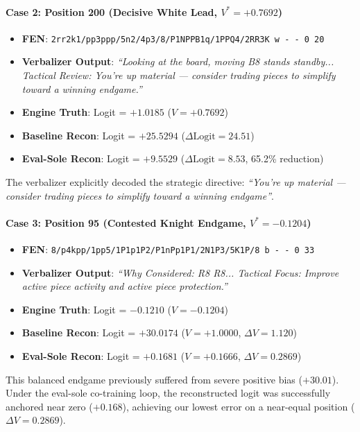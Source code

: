 \documentclass[10pt,twocolumn]{article}
\begin{document}
\paragraph{Case 2: Position 200 (Decisive White Lead, $V^* = +0.7692$)}
\begin{itemize}
    \item \textbf{FEN}: \texttt{2rr2k1/pp3ppp/5n2/4p3/8/P1NPPB1q/1PPQ4/2RR3K w - - 0 20}
    \item \textbf{Verbalizer Output}: \textit{``Looking at the board, moving B8 stands standby... Tactical Review: You're up material --- consider trading pieces to simplify toward a winning endgame.''}
    \item \textbf{Engine Truth}: Logit = $+1.0185$ ($V = +0.7692$)
    \item \textbf{Baseline Recon}: Logit = $+25.5294$ ($\Delta \text{Logit} = 24.51$)
    \item \textbf{Eval-Sole Recon}: Logit = $\mathbf{+9.5529}$ ($\Delta \text{Logit} = 8.53$, 65.2\% reduction)
\end{itemize}
The verbalizer explicitly decoded the strategic directive: \textit{``You're up material --- consider trading pieces to simplify toward a winning endgame''}.

\paragraph{Case 3: Position 95 (Contested Knight Endgame, $V^* = -0.1204$)}
\begin{itemize}
    \item \textbf{FEN}: \texttt{8/p4kpp/1pp5/1P1p1P2/P1nPp1P1/2N1P3/5K1P/8 b - - 0 33}
    \item \textbf{Verbalizer Output}: \textit{``Why Considered: R8 R8... Tactical Focus: Improve active piece activity and active piece protection.''}
    \item \textbf{Engine Truth}: Logit = $-0.1210$ ($V = -0.1204$)
    \item \textbf{Baseline Recon}: Logit = $+30.0174$ ($V = +1.0000$, $\Delta V = 1.120$)
    \item \textbf{Eval-Sole Recon}: Logit = $\mathbf{+0.1681}$ ($V = \mathbf{+0.1666}$, $\Delta V = \mathbf{0.2869}$)
\end{itemize}
This balanced endgame previously suffered from severe positive bias ($+30.01$). Under the eval-sole co-training loop, the reconstructed logit was successfully anchored near zero ($+0.168$), achieving our lowest error on a near-equal position ($\Delta V = 0.2869$).
\end{document}
